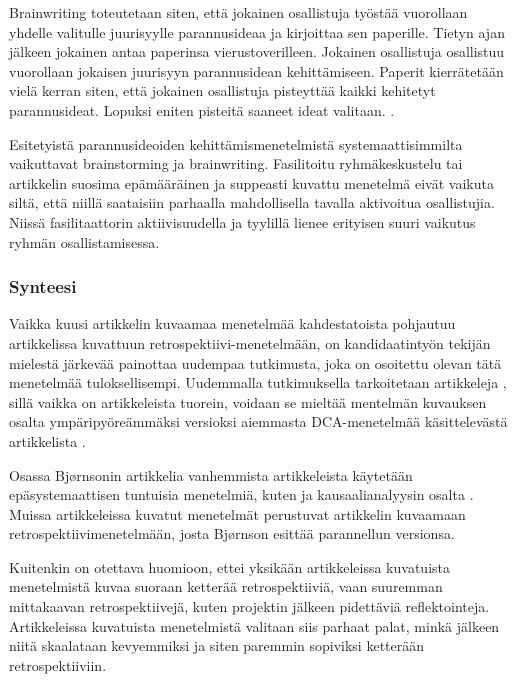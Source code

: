 Brainwriting toteutetaan siten, että jokainen osallistuja työstää vuorollaan yhdelle valitulle juurisyylle parannusideaa ja kirjoittaa sen paperille. Tietyn ajan jälkeen jokainen antaa paperinsa vierustoverilleen. Jokainen osallistuja osallistuu vuorollaan jokaisen juurisyyn parannusidean kehittämiseen. Paperit kierrätetään vielä kerran siten, että jokainen osallistuja pisteyttää kaikki kehitetyt parannusideat. Lopuksi eniten pisteitä saaneet ideat valitaan. \citep{Lehtinen2011}.

Esitetyistä parannusideoiden kehittämismenetelmistä systemaattisimmilta vaikuttavat brainstorming ja brainwriting. Fasilitoitu ryhmäkeskustelu tai artikkelin \citep{staalhane2003post} suosima epämääräinen ja suppeasti kuvattu menetelmä eivät vaikuta siltä, että niillä saataisiin parhaalla mahdollisella tavalla aktivoitua osallistujia. Niissä fasilitaattorin aktiivisuudella ja tyylillä lienee erityisen suuri vaikutus ryhmän osallistamisessa.

\subsubsection{Synteesi}
Vaikka kuusi artikkelin kuvaamaa menetelmää \citep{dingsoyr2003extending, staalhane2003post, de2004learning, Bjornson2009} kahdestatoista pohjautuu artikkelissa \citep{birk2002postmortem} kuvattuun retrospektiivi-menetelmään, on kandidaatintyön tekijän mielestä järkevää painottaa uudempaa tutkimusta, joka on osoitettu olevan tätä menetelmää tuloksellisempi. Uudemmalla tutkimuksella tarkoitetaan artikkeleja \citep{Lehtinen2011, Bjornson2009}, sillä vaikka \citep{kalinowski2012evidence} on artikkeleista tuorein, voidaan se mieltää mentelmän kuvauksen osalta ympäripyöreämmäksi versioksi aiemmasta DCA-menetelmää käsittelevästä artikkelista \citep{card1998learning}.

Osassa Bj{\o}rnsonin artikkelia vanhemmista artikkeleista käytetään epäsystemaattisen tuntuisia menetelmiä, kuten \citep{karlsson2006case, staalhane2003post} ja kausaalianalyysin osalta \citep{card1998learning}. Muissa artikkeleissa kuvatut menetelmät perustuvat artikkelin \citep{birk2002postmortem} kuvaamaan retrospektiivimenetelmään, josta Bj{\o}rnson esittää parannellun versionsa.

Kuitenkin on otettava huomioon, ettei yksikään artikkeleissa kuvatuista menetelmistä kuvaa suoraan ketterää retrospektiiviä, vaan suuremman mittakaavan retrospektiivejä, kuten projektin jälkeen pidettäviä reflektointeja. Artikkeleissa kuvatuista menetelmistä valitaan siis parhaat palat, minkä jälkeen niitä skaalataan kevyemmiksi ja siten paremmin sopiviksi ketterään retrospektiiviin.

